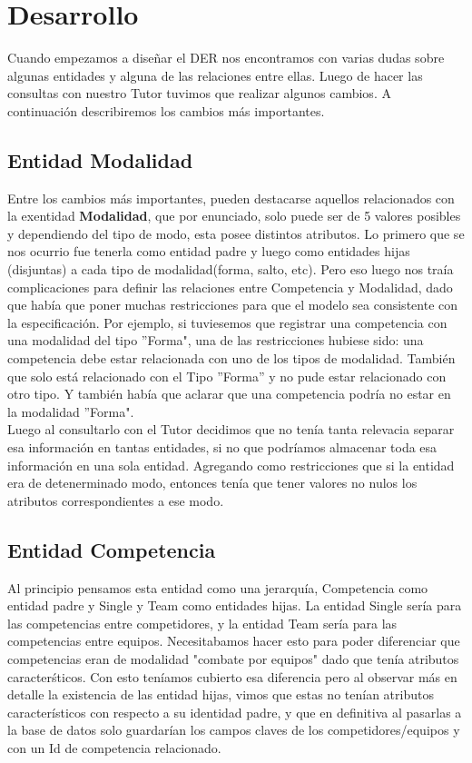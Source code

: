 \section{Desarrollo}

Cuando empezamos a diseñar el DER nos encontramos con varias dudas sobre algunas entidades y alguna de las
relaciones entre ellas. Luego de hacer las consultas con nuestro Tutor tuvimos que realizar algunos cambios. A continuaci\'on describiremos los cambios más importantes.

\subsection{Entidad Modalidad}

Entre los cambios más importantes, pueden destacarse aquellos relacionados con la exentidad \textbf{Modalidad}, que por enunciado, solo puede ser de 5 valores posibles y dependiendo del tipo de modo, esta posee distintos atributos. Lo primero que se nos ocurrio fue tenerla como entidad padre y luego como entidades hijas (disjuntas) a cada tipo de modalidad(forma, salto, etc).
Pero eso luego nos tra\'ia complicaciones para definir las relaciones entre Competencia y Modalidad, dado que había que poner muchas restricciones para que el modelo sea consistente con la especificación. 
Por ejemplo, si tuviesemos que registrar una competencia con una modalidad del tipo ''Forma", una de las restricciones hubiese sido: una competencia debe estar relacionada con uno de los tipos de modalidad. También que solo está relacionado con el Tipo ''Forma'' y no pude estar relacionado con otro tipo. 
Y también había que aclarar que una competencia podría no estar en la modalidad ''Forma". \\

Luego al consultarlo con el Tutor decidimos que no tenía tanta relevacia separar esa información en tantas entidades, si no que podr\'iamos almacenar toda esa información en una sola entidad. Agregando como restricciones que si la entidad era de detenerminado modo, entonces tenía que tener valores no nulos los atributos correspondientes a ese modo. \\

\subsection{Entidad Competencia}


Al principio pensamos esta entidad como una jerarqu\'ia, Competencia como entidad padre y Single y Team como entidades hijas. La entidad Single ser\'ia para las competencias entre competidores, y la entidad Team ser\'ia para las competencias entre equipos. Necesitabamos hacer esto para poder diferenciar que competencias eran de modalidad "combate por equipos" dado que tenía atributos caracter\'sticos. Con esto teníamos cubierto esa diferencia pero al observar m\'as en detalle la existencia de las entidad hijas, vimos que estas no tenían atributos característicos con respecto a su identidad padre, y que en definitiva al pasarlas a la base de datos solo guardar\'ian los campos claves de los competidores/equipos y con un Id de competencia relacionado.\\

